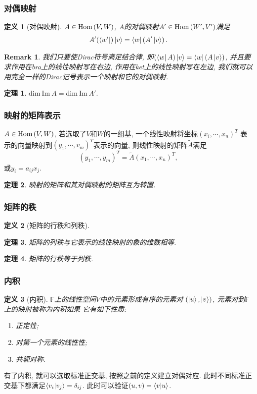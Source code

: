 \documentclass[11pt]{beamer}
\newtheorem{prob}{问题}[section]
\newtheorem{defi}{定义}[section]
\newtheorem{thrm}{定理}[section]
\newtheorem{rmk}{Remark}[section]
\def\dim{\mathrm{dim}}
\begin{document}
\def\dim{\mathrm{dim}}
\def\ker{\mathrm{ker}}
\def\Im{\mathrm{Im}}

\begin{frame}
	\frametitle{对偶映射}
	\begin{defi}[对偶映射]
		$A\in\mathrm{Hom}\left(V,W\right)$, $A$的对偶映射$A'\in\mathrm{Hom}\left(W',V'\right)$满足
		\[A'(\bra{w'})\ket{v}=\bra{w}\left(A'\ket{v}\right).\]
	\end{defi}
	\begin{rmk}
		我们只要使Dirac符号满足结合律, 即$\left(\bra{w}A\right)\ket{v}=\bra{w}\left(A\ket{v}\right)$,
		并且要求作用在bra上的线性映射写在右边, 作用在ket上的线性映射写在左边,
		我们就可以用完全一样的Dirac记号表示一个映射和它的对偶映射.
	\end{rmk}
	\begin{thrm}
		$\dim\ \Im\  A=\dim\ \Im\  A'.$
	\end{thrm}
\end{frame}

\begin{frame}
	\frametitle{映射的矩阵表示}
	$A\in\mathrm{Hom}\left(V,W\right)$, 若选取了$V$和$W$的一组基, 一个线性映射将坐标$(x_i,\cdots,x_n)^T$
	表示的向量映射到$(y_1,\cdots,v_m)^T$表示的向量, 则线性映射的矩阵$\tilde{A}$满足
	\[(y_1,\cdots,y_m)^T=\tilde{A}(x_1,\cdots,x_n)^T,\]
	或$y_i=a_{ij}x_j.$\par
	\begin{thrm}
		映射的矩阵和其对偶映射的矩阵互为转置.
	\end{thrm}
\end{frame}

\begin{frame}
	\frametitle{矩阵的秩}
	\begin{defi}[矩阵的行秩和列秩]
	\end{defi}
	\begin{thrm}
		矩阵的列秩与它表示的线性映射的象的维数相等.
	\end{thrm}
	\begin{thrm}
		矩阵的行秩等于列秩.
	\end{thrm}
\end{frame}

\begin{frame}
	\frametitle{内积}
	\begin{defi}[内积]
		$\mathbb{F}$上的线性空间$V$中的元素形成有序的元素对
		$\left(\ket{u},\ket{v}\right)$, 元素对到$\mathbb{F}$上的映射被称为内积如果
		它有如下性质:
		\begin{enumerate}
			\item 正定性;
			\item 对第一个元素的线性性;
			\item 共轭对称.
		\end{enumerate}
	\end{defi}
	有了内积, 就可以选取标准正交基, 按照之前的定义建立对偶对应.
	此时不同标准正交基下都满足$\braket{v_i|v_j}=\delta_{ij}$.
	此时可以验证$(u,v)=\braket{v|u}$.
\end{frame}

		
\end{document}
